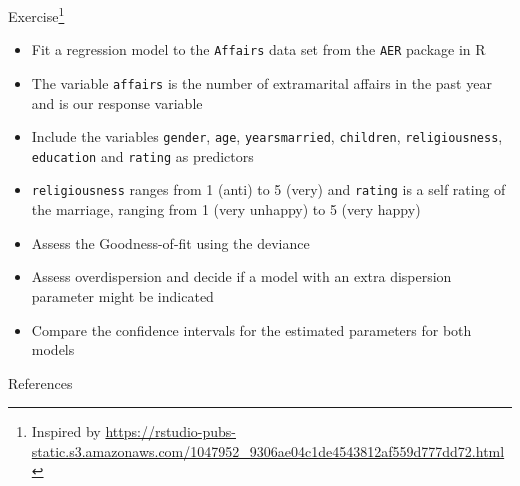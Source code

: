 \documentclass[aspectratio=169]{beamer}
\begin{document}
\begin{frame}[fragile]{}
  \begin{block}{Exercise\footnote{Inspired by \url{https://rstudio-pubs-static.s3.amazonaws.com/1047952_9306ae04c1de4543812af559d777dd72.html}}}
    \begin{itemize}
      \item Fit a regression model to the \texttt{Affairs} data set from the
        \texttt{AER} package in R
      \item The variable \texttt{affairs} is the number of extramarital affairs
        in the past year and is our response variable
      \item Include the variables \texttt{gender}, \texttt{age},
        \texttt{yearsmarried}, \texttt{children}, \texttt{religiousness},
        \texttt{education} and \texttt{rating} as predictors
      \item \texttt{religiousness} ranges from 1 (anti) to 5 (very) and
        \texttt{rating} is a self rating of the marriage, ranging from 1 (very
        unhappy) to 5 (very happy)
      \item Assess the Goodness-of-fit using the deviance
      \item Assess overdispersion and decide if a model with an extra dispersion
        parameter might be indicated
      \item Compare the confidence intervals for the estimated parameters for
    both models \end{itemize}
  \end{block}
\end{frame}

\appendix

\begin{frame}{References}
  \printbibliography
  \vfill
\end{frame}
\end{document}

